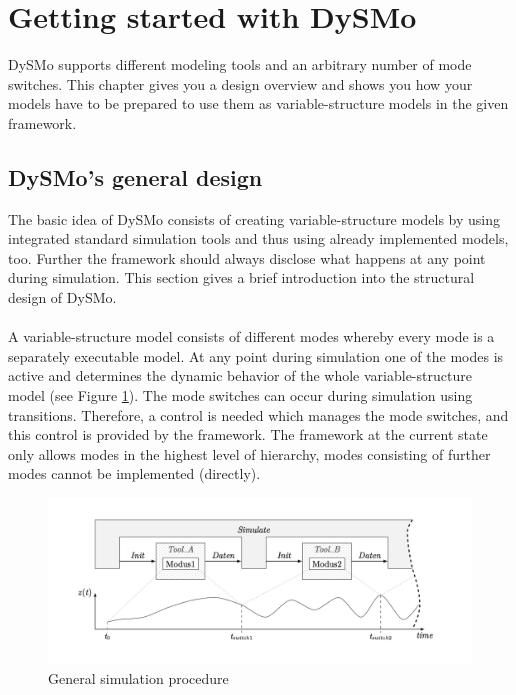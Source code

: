 \section{Getting started with DySMo}\label{kap2}

DySMo supports different modeling tools and an arbitrary number of mode switches. This chapter gives you a design overview and shows you how your models have to be prepared to use them as variable-structure models in the given framework.

\subsection{DySMo's general design}

The basic idea of DySMo consists of creating variable-structure models by using integrated standard simulation tools and thus using already implemented models, too. Further the framework should always disclose what happens at any point during simulation. This section gives a brief introduction into the structural design of DySMo.\\
\\
A variable-structure model consists of different modes whereby every mode is a separately executable model. At any point during simulation one of the modes is active and determines the dynamic behavior of the whole variable-structure model (see Figure \ref{fig:simulation}). The mode switches can occur during simulation using transitions. Therefore, a control is needed which manages the mode switches, and this control is provided by the framework. The framework at the current state only allows modes in the highest level of hierarchy, modes consisting of further modes cannot be implemented (directly).

 \begin{figure}[htb]
 \centering
 \includegraphics[width=1.0\textwidth,angle=0]{images/GettingStarted/simulation}
 \caption[General simulation procedure]{General simulation procedure}
 \label{fig:simulation}
\end{figure}


